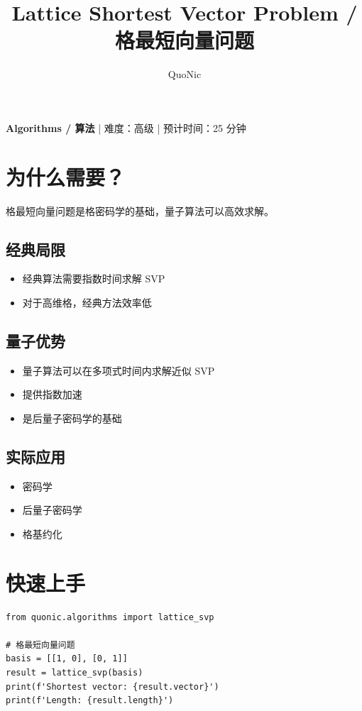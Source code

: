 \documentclass[12pt,a4paper]{article}
\title{Lattice Shortest Vector Problem / 格最短向量问题}
\author{QuoNic}
\date{}
\begin{document}
\maketitle

\begin{center}
\textbf{Algorithms / 算法} | 难度：高级 | 预计时间：25 分钟
\end{center}

\tableofcontents
\newpage

\section{为什么需要？}

格最短向量问题是格密码学的基础，量子算法可以高效求解。

\subsection{经典局限}
\begin{itemize}
  \item 经典算法需要指数时间求解 SVP
  \item 对于高维格，经典方法效率低
\end{itemize}

\subsection{量子优势}
\begin{itemize}
  \item 量子算法可以在多项式时间内求解近似 SVP
  \item 提供指数加速
  \item 是后量子密码学的基础
\end{itemize}

\subsection{实际应用}
\begin{itemize}
  \item 密码学
  \item 后量子密码学
  \item 格基约化
\end{itemize}

\section{快速上手}

\begin{verbatim}
from quonic.algorithms import lattice_svp

# 格最短向量问题
basis = [[1, 0], [0, 1]]
result = lattice_svp(basis)
print(f'Shortest vector: {result.vector}')
print(f'Length: {result.length}')
\end{verbatim}
\end{document}
